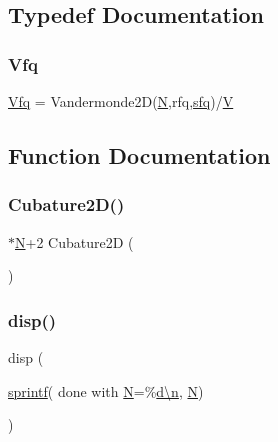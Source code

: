\subsection{Typedef Documentation}
\mbox{\label{a01014_ad06233c3cbd809b83fb292471e66fc78}} 
\subsubsection{\texorpdfstring{Vfq}{Vfq}}
{\footnotesize\ttfamily \hyperlink{a01014_ad06233c3cbd809b83fb292471e66fc78}{Vfq} = Vandermonde2D(\hyperlink{a00473_a5b9c4563028063ee53b517cce9aa701b}{N},rfq,\hyperlink{a00473_af5555ce3d578203ae1f6d0731e4f1170}{sfq})/\hyperlink{a00575_af658e24e5ad7935911c432c5c02d895c}{V}}



\subsection{Function Documentation}
\mbox{\label{a01014_a35d9a281e74f29c5f8d971883d179009}} 
\subsubsection{\texorpdfstring{Cubature2\+D()}{Cubature2D()}}
{\footnotesize{}$\ast$\hyperlink{a00473_a5b9c4563028063ee53b517cce9aa701b}{N}+2 Cubature2D (\begin{DoxyParamCaption}{ }\end{DoxyParamCaption})\hspace{0.3cm}{\ttfamily [virtual]}}

\mbox{\label{a01014_a7b5a959e1fa05b85090f4f729b0f9784}} 
\subsubsection{\texorpdfstring{disp()}{disp()}}
{\footnotesize\ttfamily disp (\begin{DoxyParamCaption}\item[{\hyperlink{a00575_ae6aab5c308faac0fc539cc9c6da9fbd0}{sprintf}( \textquotesingle{}done with \hyperlink{a00473_a5b9c4563028063ee53b517cce9aa701b}{N}=\%\hyperlink{a00623_a781a04ab095280f838ff3eb0e51312e0}{d\textbackslash{}n}\textquotesingle{}, \hyperlink{a00473_a5b9c4563028063ee53b517cce9aa701b}{N})}]{ }\end{DoxyParamCaption})}

